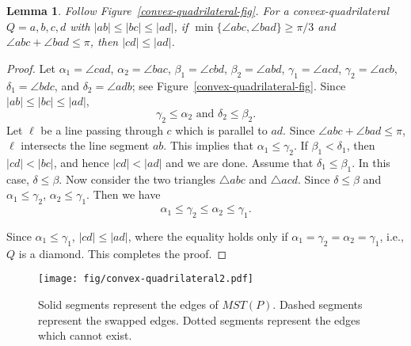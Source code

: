 \documentclass[11pt,a4paper]{article}
\newtheorem{lemma}{Lemma}
\begin{document}
\begin{lemma}
\label{convex-quadrilateral-lemma}
Follow Figure~\ref{convex-quadrilateral-fig}. For a convex-quadrilateral $Q=a,b,c,d$ with $|ab|\le|bc|\le|ad|$, if  $\min\{\angle abc, \angle bad\}\ge \pi/3$ and $\angle abc + \angle bad \le \pi$, then $|cd|\le |ad|$.
\end{lemma}
\begin{proof}
 Let $\alpha_1=\angle cad$, $\alpha_2=\angle bac$, $\beta_1=\angle cbd$, $\beta_2=\angle abd$, $\gamma_1=\angle acd$, $\gamma_2=\angle acb$, $\delta_1=\angle bdc$, and $\delta_2=\angle adb$; see Figure~\ref{convex-quadrilateral-fig}. Since $|ab|\le|bc|\le |ad|$, $$\gamma_2\le \alpha_2\text{ and }\delta_2\le \beta_2.$$ Let $\ell$ be a line passing through $c$ which is parallel to $ad$. Since $\angle abc + \angle bad \le \pi$, $\ell$ intersects the line segment $ab$. This implies that $\alpha_1\le \gamma_2$. If $\beta_1<\delta_1$, then $|cd|<|bc|$, and hence $|cd|<|ad|$ and we are done. Assume that $\delta_1\le \beta_1$. In this case, $\delta\le \beta$. Now consider the two triangles $\bigtriangleup abc$ and $\bigtriangleup acd$. Since $\delta\le \beta$ and $\alpha_1\le\gamma_2$, $\alpha_2\le \gamma_1$. Then we have $$\alpha_1\le \gamma_2\le \alpha_2\le\gamma_1.$$

Since $\alpha_1\le\gamma_1$, $|cd|\le |ad|$, where the equality holds only if $\alpha_1= \gamma_2= \alpha_2=\gamma_1$, i.e., $Q$ is a diamond. This completes the proof.
\end{proof}

\begin{figure}[htb]
  \centering
  \texttt{[image: fig/convex-quadrilateral2.pdf]}
  \caption{Solid segments represent the edges of $MST(P)$. Dashed segments represent the swapped edges. Dotted segments represent the edges which cannot exist.}
\label{degree8-fig}
\end{figure}
\end{document}
